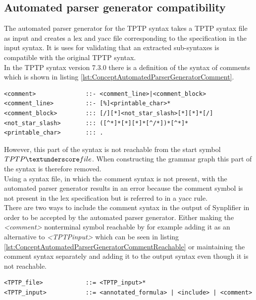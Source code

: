 \subsection{Automated parser generator compatibility}\label{sec:ConceptAutomatedParserGenerator}

The automated parser generator for the \ac{TPTP} syntax \cite{VS06} takes a \ac{TPTP} syntax file as input and creates a lex and yacc file corresponding to the specification in the input syntax. It is uses for validating that an extracted sub-syntaxes is compatible with the original \ac{TPTP} syntax.\\
In the \ac{TPTP} syntax version 7.3.0 there is a definition of the syntax of comments which is shown in listing \ref{lst:ConceptAutomatedParserGeneratorComment}.
\begin{lstlisting}[language=none, basicstyle=\scriptsize, caption=Comment syntax definition in the \ac{TPTP} syntax, label= lst:ConceptAutomatedParserGeneratorComment]
<comment>              ::- <comment_line>|<comment_block> 
<comment_line>         ::- [%]<printable_char>*
<comment_block>        ::: [/][*]<not_star_slash>[*][*]*[/]
<not_star_slash>       ::: ([^*]*[*][*]*[^/*])*[^*]*
<printable_char>       ::: .
\end{lstlisting}

However, this part of the syntax is not reachable from the start symbol $TPTP\textunderscore file$.
When constructing the grammar graph this part of the syntax is therefore removed.\\
Using a syntax file, in which the comment syntax is not present, with the automated parser generator results in an error because the comment symbol is not present in the lex specification but is referred to in a yacc rule.\\
There are two ways to include the comment syntax in the output of \ac{Synplifier} in order to be accepted by the automated parser generator.
Either making the \textit{<comment>} nonterminal symbol reachable by for example adding it as an alternative to \textit{<TPTP\textunderscore input>} which can be seen in listing \ref{lst:ConceptAutomatedParserGeneratorCommentReachable} or maintaining the comment syntax separately and adding it to the output syntax even though it is not reachable.
\begin{lstlisting}[language=none, basicstyle=\scriptsize, caption=Making the comment syntax reachable, label= lst:ConceptAutomatedParserGeneratorCommentReachable]
<TPTP_file>            ::= <TPTP_input>*
<TPTP_input>           ::= <annotated_formula> | <include> | <comment>
\end{lstlisting}

